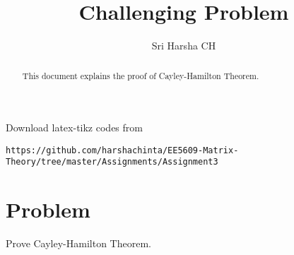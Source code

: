 \documentclass[journal,12pt,twocolumn]{IEEEtran}
\begin{document}
\renewcommand{\thefigure}{\theproblem}

\def\putbox#1#2#3{\makebox[0in][l]{\makebox[#1][l]{}\raisebox{\baselineskip}[0in][0in]{\raisebox{#2}[0in][0in]{#3}}}}
     \def\rightbox#1{\makebox[0in][r]{#1}}
     \def\centbox#1{\makebox[0in]{#1}}
     \def\topbox#1{\raisebox{-\baselineskip}[0in][0in]{#1}}
     \def\midbox#1{\raisebox{-0.5\baselineskip}[0in][0in]{#1}}
\vspace{3cm}
\title{Challenging Problem}
\author{Sri Harsha CH}

\maketitle
\newpage

\bigskip
\renewcommand{\thefigure}{\theenumi}
\renewcommand{\thetable}{\theenumi}

\begin{abstract}
This document explains the proof of Cayley-Hamilton Theorem.
\end{abstract}

Download latex-tikz codes from 
%
\begin{lstlisting}
https://github.com/harshachinta/EE5609-Matrix-Theory/tree/master/Assignments/Assignment3
\end{lstlisting}
%
\section{Problem}
Prove Cayley-Hamilton Theorem.
\end{document}
